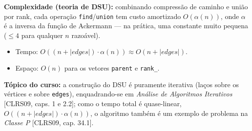 \textbf{Complexidade (teoria de DSU):} combinando compressão de caminho e
união por rank, cada operação \texttt{find}/\texttt{union} tem custo
amortizado $O(\alpha(n))$, onde $\alpha$ é a inversa da função de Ackermann
--- na prática, uma constante muito pequena ($\leq 4$ para qualquer $n$
razoável).

\begin{itemize}
    \item Tempo: $O((n + |edges|) \cdot \alpha(n)) \approx O(n + |edges|)$.
    \item Espaço: $O(n)$ para os vetores \texttt{parent} e
    \texttt{rank\_}.
\end{itemize}

\textbf{Tópico do curso:} a construção do DSU é puramente iterativa (laços
sobre os vértices e sobre \texttt{edges}), enquadrando-se em \emph{Análise de
Algoritmos Iterativos} [CLRS09, caps. 1 e 2.2]; como o tempo total é
quase-linear, $O((n+|edges|)\cdot\alpha(n))$, o algoritmo também é um exemplo
de problema na \emph{Classe P} [CLRS09, cap. 34.1].
